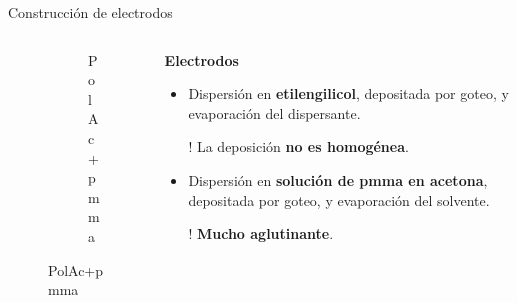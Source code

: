 \documentclass[aspectratio=169]{beamer}
\begin{document}
\begin{frame}{Construcción de electrodos}
\begin{columns}
\begin{column}{0.3\textwidth}
\begin{figure}
{\begin{subfigure}[b]{\electrodesWidth}
						\caption{PolAc+pmma}
					\end{subfigure}}
				\end{figure}
			\end{column}
			\begin{column}{0.6\textwidth}
				\textbf{Electrodos}
				\begin{itemize}[<+(1)->]
					\item Dispersión en \textbf{etilengilicol}, depositada por goteo, y evaporación del dispersante.
					\item[!] La deposición \textbf{no es homogénea}.
					\item Dispersión en \textbf{solución de pmma en acetona}, depositada por goteo, y evaporación del solvente.
					\item[!] \textbf{Mucho aglutinante}.
				\end{itemize}
			\end{column}
		\end{columns}		
	\end{frame}
\end{document}
